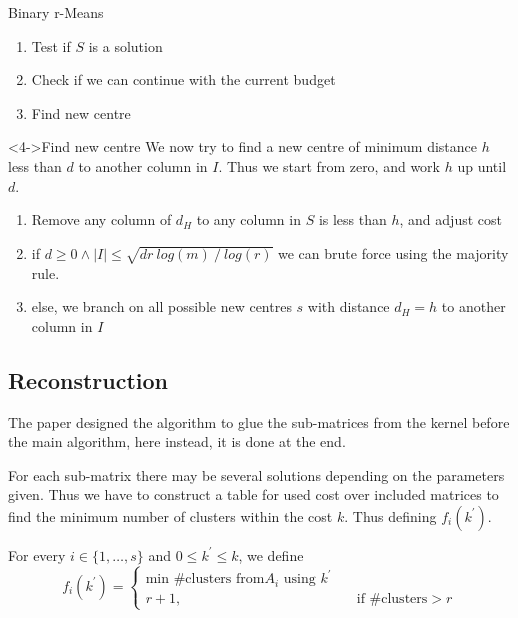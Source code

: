 \documentclass{beamer}
\begin{document}
\begin{frame}
  \begin{block}{Binary r-Means}
    \begin{enumerate}
      \item<1-> Test if $S$ is a solution
      \item<2-> Check if we can continue with the current budget
      \item<3-> Find new centre
    \end{enumerate}
  \end{block}

  \begin{block}<4->{Find new centre}
    We now try to find a new centre of minimum distance $h$ less than $d$ to another column in $I$. Thus
    we start from zero, and work $h$ up until $d$.

    \begin{enumerate}
      \item<5-> Remove any column of $d_H$ to any column in $S$ is less than $h$, and adjust cost
      \item<6-> if $d \geq 0 \wedge |I| \leq \sqrt{d r ~log(m) ~/ ~log(r)}$ we can brute force using the
      majority rule.
      \item<7-> else, we branch on all possible new centres $s$ with distance $d_H = h$ to another
      column in $I$
    \end{enumerate}
  \end{block}
\end{frame}

\subsection{Reconstruction}
\begin{frame}
  The paper \cite{fomin_golovach_panolan_2020} designed the algorithm to glue the sub-matrices from
  the kernel before the main algorithm, here instead, it is done at the end.

  For each sub-matrix there may be several solutions depending on the parameters given. Thus we have
  to construct a table for used cost over included matrices to find the minimum number of clusters
  within the cost $k$. \pause Thus defining $f_i(k^\prime)$.

  \begin{block}{For every $i \in \{1,\dots,s\}$ and $0 \leq k^\prime \leq k$, we define}
    \[ f_i(k^\prime) =
      \begin{cases}
        \text{min \#clusters from} A_i \text{ using } k^\prime &                                \\
        r+1,                                                   & \quad \text{if \#clusters} > r
      \end{cases}
    \]
  \end{block}
\end{frame}
\end{document}
